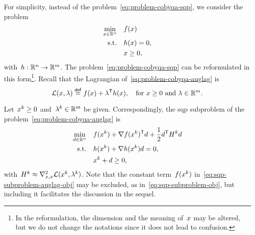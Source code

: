 For simplicity, instead of the problem~\cref{eq:problem-cobyqa-sqp}, we consider the problem
\begin{subequations}
    \label{eq:problem-cobyqa-auglag}
    \begin{align}
        \min_{\iter \in \R^n}   & \quad \obj(\iter)\\
        \text{s.t.}             & \quad h(\iter) = 0,\\
                                & \quad \iter \ge 0,
    \end{align}
\end{subequations}
with~$h : \mathbb{R}^n \to \mathbb{R}^m$.
The problem~\cref{eq:problem-cobyqa-sqp} can be reformulated in this form\footnote{In the reformulation, the dimension and the meaning of~$\iter$ may be altered, but we do not change the notations since it does not lead to confusion.}.
Recall that the Lagrangian of~\cref{eq:problem-cobyqa-auglag} is
\begin{equation*}
    \lag(\iter, \lm) \eqdef \obj(\iter) + \lm^{\T} h(\iter), \quad \text{for~$\iter \ge 0$ and~$\lm \in \R^m$.}
\end{equation*}

Let~$\iter[k] \ge 0$ and~$\lm[k] \in \R^m$ be given.
Correspondingly, the \gls{sqp} subproblem of the problem~\cref{eq:problem-cobyqa-auglag} is
\begin{subequations}
    \label{eq:sqp-subproblem-auglag}
    \begin{align}
        \min_{\step \in \R^n}   & \quad \obj(\iter[k]) + \nabla \obj(\iter[k])^{\T} \step + \frac{1}{2} \step^{\T} H^k \step \label{eq:sqp-subproblem-auglag-obj}\\
        \text{s.t.}             & \quad h(\iter[k]) + \nabla h(\iter[k]) \step = 0,\\
                                & \quad \iter[k] + \step \ge 0,
    \end{align}
\end{subequations}
with~$H^k \approx \nabla_{x, x}^2 \lag(\iter[k], \lm[k])$.
Note that the constant term~$\obj(\iter[k])$ in~\cref{eq:sqp-subproblem-auglag-obj} may be excluded, as in~\cref{eq:sqp-subproblem-obj}, but including it facilitates the discussion in the sequel.

